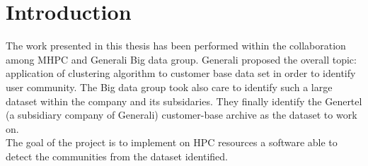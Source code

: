 \documentclass[a4paper,11pt]{book}
\begin{document}

%
%

\clearpage
\tableofcontents



\thispagestyle{empty}
\clearpage{\pagestyle{empty}\cleardoublepage}\thispagestyle{empty}
\chapter{Introduction}
The work presented in this thesis  has been performed within the collaboration among MHPC and Generali Big data group. Generali proposed the overall topic: application of clustering algorithm to customer base data set in order to identify user community.  The Big data group took also care to identify  such a large dataset within the company and its subsidaries. They finally identify the  Genertel (a subsidiary company of Generali) customer-base archive as the dataset to work on.\\
The goal of the project is to implement on HPC resources a software able to detect the communities from the dataset identified.\\
\end{document}
